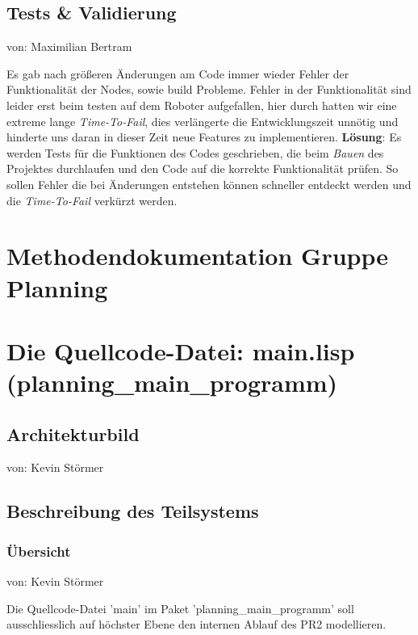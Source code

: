 \documentclass{suturo}
\makeatletter
\newcommand{\chapterauthor}[1]{%
  {\parindent0pt\vspace*{-27pt}%
  \linespread{0}\small\begin{flushright}von: #1\end{flushright}%
  \par\nobreak\vspace*{0pt}}
  \@afterheading%
}
\makeatother
\begin{document}
\subsection{Tests \& Validierung}
\chapterauthor{Maximilian Bertram}
Es gab nach größeren Änderungen am Code immer wieder Fehler der Funktionalität der Nodes, sowie build Probleme.
Fehler in der Funktionalität sind leider erst beim testen auf dem Roboter aufgefallen, hier durch hatten wir eine extreme lange \textit{Time-To-Fail}, dies verlängerte die Entwicklungszeit unnötig und hinderte uns daran in dieser Zeit neue Features zu implementieren.
\textbf{Lösung}: Es werden Tests für die Funktionen des Codes geschrieben, die beim \textit{Bauen} des Projektes durchlaufen und den Code auf die korrekte Funktionalität prüfen. So sollen Fehler die bei Änderungen entstehen können schneller entdeckt werden und die \textit{Time-To-Fail} verkürzt werden.

\section*{Methodendokumentation Gruppe Planning}
\section{Die Quellcode-Datei: main.lisp (planning\_main\_programm)}
\subsection{Architekturbild}
\chapterauthor{Kevin Störmer}


\begin{figure}[!htb]
\end{figure}



\subsection{Beschreibung des Teilsystems}
\subsubsection{\"Ubersicht}
\chapterauthor{Kevin Störmer}
Die Quellcode-Datei 'main' im Paket 'planning\_main\_programm' soll ausschliesslich auf höchster Ebene den internen Ablauf des PR2 modellieren. 
\end{document}
